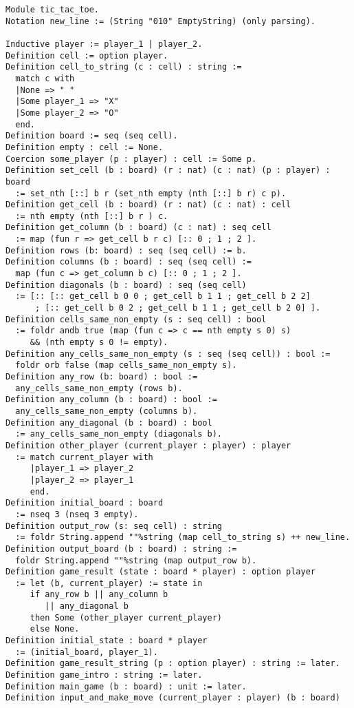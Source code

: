 \documentclass{article}
\theoremstyle{definition}
\begin{document}
\begin{verbatim}
Module tic_tac_toe.
Notation new_line := (String "010" EmptyString) (only parsing).

Inductive player := player_1 | player_2.
Definition cell := option player.
Definition cell_to_string (c : cell) : string := 
  match c with
  |None => " "
  |Some player_1 => "X"
  |Some player_2 => "O"
  end.
Definition board := seq (seq cell).
Definition empty : cell := None.
Coercion some_player (p : player) : cell := Some p.
Definition set_cell (b : board) (r : nat) (c : nat) (p : player) : board 
  := set_nth [::] b r (set_nth empty (nth [::] b r) c p).
Definition get_cell (b : board) (r : nat) (c : nat) : cell 
  := nth empty (nth [::] b r ) c.
Definition get_column (b : board) (c : nat) : seq cell 
  := map (fun r => get_cell b r c) [:: 0 ; 1 ; 2 ].
Definition rows (b: board) : seq (seq cell) := b.
Definition columns (b : board) : seq (seq cell) := 
  map (fun c => get_column b c) [:: 0 ; 1 ; 2 ].
Definition diagonals (b : board) : seq (seq cell) 
  := [:: [:: get_cell b 0 0 ; get_cell b 1 1 ; get_cell b 2 2] 
      ; [:: get_cell b 0 2 ; get_cell b 1 1 ; get_cell b 2 0] ].
Definition cells_same_non_empty (s : seq cell) : bool 
  := foldr andb true (map (fun c => c == nth empty s 0) s)
     && (nth empty s 0 != empty).
Definition any_cells_same_non_empty (s : seq (seq cell)) : bool := 
  foldr orb false (map cells_same_non_empty s).
Definition any_row (b: board) : bool := 
  any_cells_same_non_empty (rows b).
Definition any_column (b : board) : bool := 
  any_cells_same_non_empty (columns b).
Definition any_diagonal (b : board) : bool 
  := any_cells_same_non_empty (diagonals b).
Definition other_player (current_player : player) : player 
  := match current_player with
     |player_1 => player_2
     |player_2 => player_1
     end.
Definition initial_board : board 
  := nseq 3 (nseq 3 empty).
Definition output_row (s: seq cell) : string 
  := foldr String.append ""%string (map cell_to_string s) ++ new_line.
Definition output_board (b : board) : string := 
  foldr String.append ""%string (map output_row b).
Definition game_result (state : board * player) : option player
  := let (b, current_player) := state in
     if any_row b || any_column b 
        || any_diagonal b
     then Some (other_player current_player)
     else None.
Definition initial_state : board * player 
  := (initial_board, player_1).
Definition game_result_string (p : option player) : string := later.
Definition game_intro : string := later.
Definition main_game (b : board) : unit := later.
Definition input_and_make_move (current_player : player) (b : board)

\end{verbatim}
\end{document}

